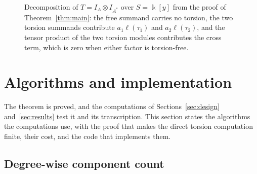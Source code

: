 \documentclass[11pt]{article}
\theoremstyle{definition}
\theoremstyle{remark}
\newcommand{\kk}{\Bbbk}
\newcommand{\tor}{\tau}
\newcommand{\len}{\ell}
\begin{document}
\begin{figure}[t]
\centering
{}
\caption{Decomposition of $T=I_A\otimes I_{A^*}$ over $S=\kk[y]$ from the proof of Theorem~\ref{thm:main}: the free
summand carries no torsion, the two torsion summands contribute $a_1\len(\tor_1)$ and $a_2\len(\tor_2)$, and the
tensor product of the two torsion modules contributes the cross term, which is zero when either factor is
torsion-free.}\label{fig:decomposition}
\end{figure}

\section{Algorithms and implementation}\label{sec:algorithms}

The theorem is proved, and the computations of Sections~\ref{sec:design} and~\ref{sec:results} test it and its
transcription. This section states the algorithms the computations use, with the proof that makes the direct
torsion computation finite, their cost, and the code that implements them.

\subsection{Degree-wise component count}
\end{document}
